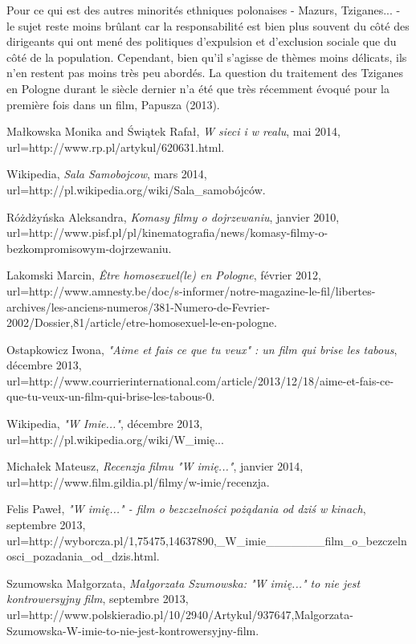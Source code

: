 \documentclass[12pt]{amsart}
\begin{document}
Pour ce qui est des autres minorités ethniques polonaises - Mazurs, Tziganes... - le sujet reste moins brûlant car la responsabilité est bien plus souvent du côté des dirigeants qui ont mené des politiques d'expulsion et d'exclusion sociale que du côté de la population. Cependant, bien qu'il s'agisse de thèmes moins délicats, ils n'en restent pas moins très peu abordés. La question du traitement des Tziganes en Pologne durant le siècle dernier n'a été que très récemment évoqué pour la première fois dans un film, Papusza (2013). 

\clearpage
\begin{thebibliography}{100}

	Małkowska Monika and Świątek Rafał,
	\emph{W sieci i w realu},
	mai 2014,
	url=http://www.rp.pl/artykul/620631.html.

	Wikipedia,
	\emph{Sala Samobojcow},
	mars 2014,
	url=http://pl.wikipedia.org/wiki/Sala\_samobójców.


	Różdżyńska Aleksandra,
	\emph{Komasy filmy o dojrzewaniu},
	janvier 2010,
	url=http://www.pisf.pl/pl/kinematografia/news/komasy-filmy-o-bezkompromisowym-dojrzewaniu.


	Lakomski Marcin,
	\emph{Être homosexuel(le) en Pologne},
	février 2012,
	url=http://www.amnesty.be/doc/s-informer/notre-magazine-le-fil/libertes-archives/les-anciens-numeros/381-Numero-de-Fevrier-2002/Dossier,81/article/etre-homosexuel-le-en-pologne.

	Ostapkowicz Iwona,
	\emph{"Aime et fais ce que tu veux" : un film qui brise les tabous},
	décembre 2013,
	url=http://www.courrierinternational.com/article/2013/12/18/aime-et-fais-ce-que-tu-veux-un-film-qui-brise-les-tabous-0.

	Wikipedia,
	\emph{"W Imie..."},
	décembre 2013,
	url=http://pl.wikipedia.org/wiki/W\_imię...

	Michałek Mateusz,
	\emph{Recenzja filmu "W imię..."},
	janvier 2014,
	url=http://www.film.gildia.pl/filmy/w-imie/recenzja.

	Felis Paweł,
	\emph{"W imię..." - film o bezczelności pożądania od dziś w kinach},
	septembre 2013,
	url=http://wyborcza.pl/1,75475,14637890,\_W\_imie\_\_\_\_\_\_\_film\_o\_bezczelnosci\_pozadania\_od\_dzis.html.


	Szumowska Małgorzata,
	\emph{Małgorzata Szumowska: "W imię..." to nie jest kontrowersyjny film},
	septembre 2013,
	url=http://www.polskieradio.pl/10/2940/Artykul/937647,Malgorzata-Szumowska-W-imie-to-nie-jest-kontrowersyjny-film.


\end{thebibliography}
\end{document}
